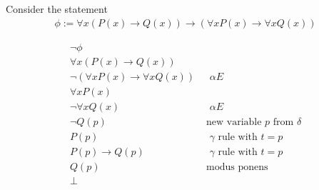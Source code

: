 \documentclass[a4paper]{article}
\theoremstyle{plain}
\theoremstyle{definition}
\newtheorem{exmp}{Example}[section]
\theoremstyle{remark}
\begin{document}
\begin{tcolorbox}[colback=black!3!white,colframe=black!60!white,title=\begin{exmp}Natural Deduction Example \label{Natural Deduction Example}\end{exmp}]
        Consider the statement
                \begin{align}
			\phi := \forall x (P(x) \to  Q(x)) \to (\forall x P(x) \to \forall x Q(x))
                \end{align}
\begin{tcolorbox}[minipage,colback=white,arc=0pt,outer arc=0pt]
\centering
\begin{align*}
	\neg \phi \\
	\forall x (P(x) \to Q(x)) &\\
	\neg (\forall x P(x) \to  \forall x Q(x)) & \text{ $\alpha E$}\\
	\forall x P(x) &\\
	\neg \forall x Q(x) & \text{ $\alpha E$}\\
	\neg Q(p) & \text{ new variable $p$ from $\delta$} \\
	P(p) & \text{ $\gamma$ rule with $t=p$} \\
	P(p) \to  Q(p) & \text{ $\gamma$ rule with $t=p$}\\
	Q(p) & \text{ modus ponens}\\
	\bot
\end{align*}
\end{tcolorbox}
\end{tcolorbox}
\end{document}
